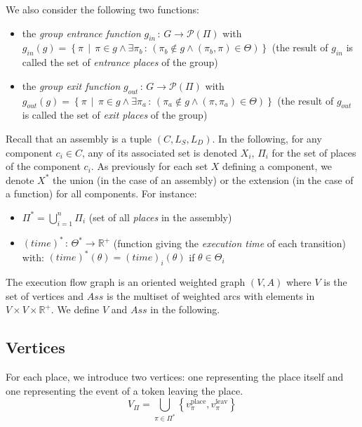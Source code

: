 We also consider the following two functions:
\begin{itemize}
\item the \emph{group entrance function} $g_{in}\,:\,G\rightarrow\mathcal{P}\left(\Pi\right)$ with\\
$g_{in}(g)=\left\{ \pi\,\mid\,\pi\in g\land\exists\pi_{b}\,:\,\left(\pi_{b}\not\in g\land\left(\pi_{b},\pi\right)\in\Theta\right)\right\} $
(the result of $g_{in}$ is called the set of \emph{entrance places}
of the group)
\item the \emph{group exit function} $g_{out}\,:\,G\rightarrow\mathcal{P}\left(\Pi\right)$ with\\
$g_{out}(g)=\left\{ \pi\,\mid\,\pi\in g\land\exists\pi_{a}\,:\,\left(\pi_{a}\not\in g\land\left(\pi,\pi_{a}\right)\in\Theta\right)\right\} $
(the result of $g_{out}$ is called the set of \emph{exit places}
of the group)
\end{itemize}

Recall that an assembly is a tuple $\left(C,L_S,L_D\right)$. In
the following, for any component $c_i \in C$, any of its
associated set is denoted $X_i$, \eg $\Pi_i$ for the set of places of
the component $c_i$.
As previously for each set $X$ defining a component, we denote $X^*$ the
union (in the case of an assembly) or the extension (in the case of
a function) for all components. For instance:
\begin{itemize}
\item $\Pi^*=\bigcup_{i=1}^{n}\Pi_{i}$ (set of all \emph{places} in
the assembly)
\item $\left(time\right)^*\,:\,\Theta^*\rightarrow\mathbb{R}^{+}$
(function giving the \emph{execution time} of each transition) with:
$\left(time\right)^*\left(\theta\right)=\left(time\right)_{i}\left(\theta\right)$
if $\theta\in\Theta_{i}$ 
\end{itemize}
The execution flow graph is an oriented weighted graph \emph{$\left(V,A\right)$}
where $V$ is the set of vertices and $Ass$ is the multiset of weighted
arcs with elements in $V\times V\times\mathbb{R}^{+}$. We define
$V$ and $Ass$ in the following.

\subsection{Vertices}

For each place, we introduce two vertices: one representing the place
itself and one representing the event of a token leaving the place.
\[
V_{\Pi}=\bigcup_{\pi\in\Pi^*}\left\{ v_\pi^\text{place},v_\pi^\text{leav}\right\} 
\]

